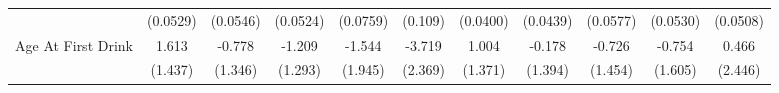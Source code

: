 {\begin{tabular}{l*{10}{c}}
            &    (0.0529)         &    (0.0546)         &    (0.0524)         &    (0.0759)         &     (0.109)         &    (0.0400)         &    (0.0439)         &    (0.0577)         &    (0.0530)         &    (0.0508)         \\
\addlinespace
Age At First Drink&       1.613         &      -0.778         &      -1.209         &      -1.544         &      -3.719         &       1.004         &      -0.178         &      -0.726         &      -0.754         &       0.466         \\
            &     (1.437)         &     (1.346)         &     (1.293)         &     (1.945)         &     (2.369)         &     (1.371)         &     (1.394)         &     (1.454)         &     (1.605)         &     (2.446)         \\
\bottomrule
\end{tabular}
}
